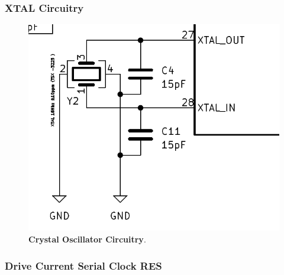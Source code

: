 \subsubsection{XTAL Circuitry}\label{02SubSub:XTALCircuitry}


\begin{figure}[H]
    \centering
    \includegraphics[scale = 0.5]{imagens/XTALCircuitry.png}
    \caption{\textbf{Crystal Oscillator Circuitry}.}
    \label{02fig:XTALCircuitry}
\end{figure}


\subsubsection{Drive Current Serial Clock RES}\label{02SubSub:DriveCurrentSerialClockRES}


